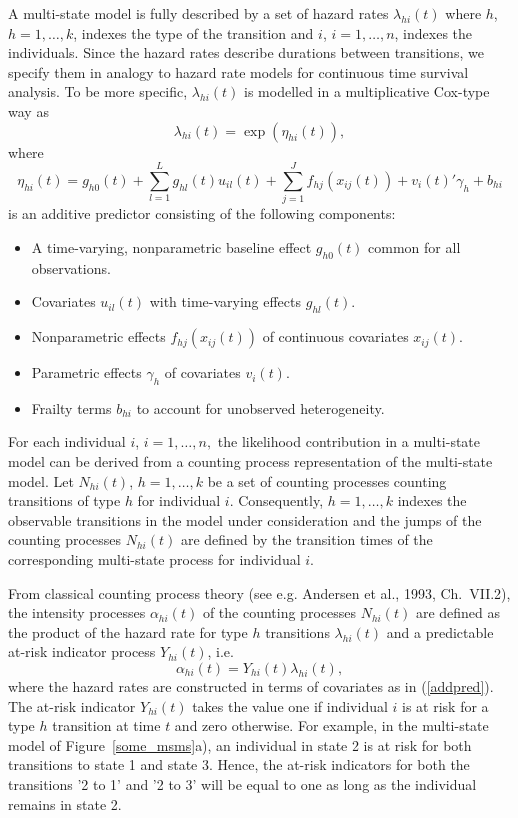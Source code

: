 \documentclass[11pt,a4paper,twoside]{bayesxarticle}
\begin{document}
A multi-state model is fully described by a set of hazard rates
$\lambda_{hi}(t)$ where $h$, $h=1,\ldots,k$, indexes the type of the
transition and $i$, $i=1,\ldots,n$, indexes the individuals. Since
the hazard rates describe durations between transitions, we specify
them in analogy to hazard rate models for continuous time survival
analysis. To be more specific, $\lambda_{hi}(t)$ is modelled in a
multiplicative Cox-type way as
\[
 \lambda_{hi}(t) = \exp(\eta_{hi}(t)),
\]
where
\begin{equation}\label{addpred}
 \eta_{hi}(t) = g_{h0}(t) + \sum_{l=1}^Lg_{hl}(t)u_{il}(t) +
 \sum_{j=1}^Jf_{hj}(x_{ij}(t)) + v_i(t)'\gamma_h +  b_{hi}
\end{equation}
is an additive predictor consisting of the following components:
\begin{itemize}
 \item A time-varying, nonparametric baseline effect $g_{h0}(t)$ common for all
 observations.
 \item Covariates $u_{il}(t)$ with time-varying effects $g_{hl}(t)$.
 \item Nonparametric effects $f_{hj}(x_{ij}(t))$ of continuous covariates
 $x_{ij}(t)$.
 \item Parametric effects $\gamma_h$ of covariates $v_i(t)$.
 \item Frailty terms $b_{hi}$ to account for unobserved
 heterogeneity.
\end{itemize}

For each individual $i$, $i=1,\ldots,n,$ the likelihood contribution
in a multi-state model can be derived from a counting process
representation of the multi-state model. Let $N_{hi}(t)$,
$h=1,\ldots,k$ be a set of counting processes counting transitions
of type $h$ for individual $i$. Consequently, $h=1,\ldots,k$ indexes
the observable transitions in the model under consideration and the
jumps of the counting processes $N_{hi}(t)$ are defined by the
transition times of the corresponding multi-state process for
individual $i$.

From classical counting process theory (see e.g. Andersen et al.,
1993, Ch.~VII.2), the intensity processes $\alpha_{hi}(t)$ of the
counting processes $N_{hi}(t)$ are defined as the product of the
hazard rate for type $h$ transitions $ \lambda_{hi}(t)$ and a
predictable at-risk indicator process $Y_{hi}(t)$, i.e.
\[
 \alpha_{hi}(t) = Y_{hi}(t) \lambda_{hi}(t),
\]
where the hazard rates are constructed in terms of covariates as in
(\ref{addpred}). The at-risk indicator $Y_{hi}(t)$ takes the value
one if individual $i$ is at risk for a type $h$ transition at time
$t$ and zero otherwise. For example, in the multi-state model of
Figure~\ref{some_msms}a), an individual in state 2 is at risk for
both transitions to state 1 and state 3. Hence, the at-risk
indicators for both the transitions '2 to 1' and '2 to 3' will be
equal to one as long as the individual remains in state 2.
\end{document}
